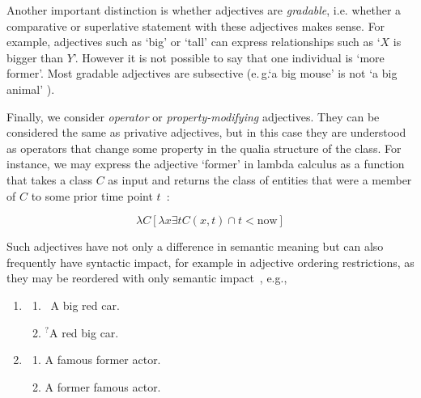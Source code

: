 \documentclass[11pt]{article}
\begin{document}
Another important distinction is whether adjectives are 
\emph{gradable}, i.e. whether a comparative 
or superlative statement with these adjectives makes sense. For example, adjectives such as 
`big' or `tall' can express relationships such as `$X$ is bigger than $Y$'. 
However it is not possible to say that one individual is `more former'. Most gradable 
adjectives are subsective (e.\,g.`a big mouse' is not `a big animal' \cite{morzycki2013nonscales}). 

Finally, we consider \emph{operator} or \emph{property-modifying} adjectives. 
They can be considered the same as privative adjectives, but in this 
case they are understood as operators that change some property in the qualia 
structure of the class. For instance, we may express the adjective `former' 
in lambda calculus as a function that takes a class $C$ as input and returns the class 
of entities that were a member of $C$ to some prior time point $t$~\cite{partee2003there}:

\vspace{-1.0em}
$$\lambda C [\lambda x \exists t C(x,t) \cap t < \mathrm{now}]$$
\vspace{-1.5em}

Such adjectives have not only a difference in semantic meaning but can also 
frequently have syntactic impact, for example in adjective ordering 
restrictions, as they may be reordered with only semantic 
impact~\cite{teodorescu2006adjective}, e.g.,

\begin{enumerate}
\item \begin{enumerate}
\item \ A big red car.
\item $^?$A red big car.
\end{enumerate} 
\label{ex:car}
\item \begin{enumerate}
\item A famous former actor.
\item A former famous actor.
\end{enumerate}
\label{ex:actor}
\end{enumerate}
\end{document}
